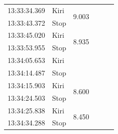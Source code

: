 \begin{longtable}{|l|l|l|l|l|l|}
  13:33:34.369 & Kiri & \multirow{2}{*}{9.003}               \\   \cline{1-2}
  13:33:43.372 & Stop &                     \\ \hline
  13:33:45.020 & Kiri & \multirow{2}{*}{8.935}               \\   \cline{1-2}
  13:33:53.955 & Stop &                     \\ \hline
  13:34:05.653 & Kiri & \multirow{2}{*}{}8.834               \\   \cline{1-2}
  13:34:14.487 & Stop &                     \\ \hline
  13:34:15.903 & Kiri & \multirow{2}{*}{8.600}               \\   \cline{1-2}
  13:34:24.503 & Stop &                     \\ \hline
  13:34:25.838 & Kiri & \multirow{2}{*}{8.450}               \\   \cline{1-2}
  13:34:34.288 & Stop &                     \\ \hline
\end{longtable}

